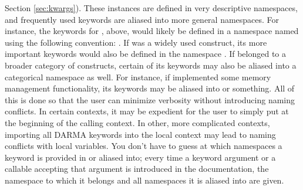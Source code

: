 Section \ref{sec:kwargs}).  These instances are defined in very descriptive namespaces,
and frequently used keywords are aliased into more general namespaces. 
For instance, the keywords for , above, would likely be 
defined in a namespace named using the following convention:
.
If  was a 
widely used construct, its more important keywords would also be defined 
in the namespace . 
If  belonged to a broader category of 
constructs, certain of its keywords may also be aliased into a 
categorical namespace as well.  For instance, if  
implemented some memory management functionality,
its keywords may be aliased into  or 
something.  All of this is done so that the user can minimize verbosity without introducing
naming conflicts.  In certain contexts, it may be expedient for the user to simply
put  at the beginning of the calling context. 
In other, more complicated contexts, importing all DARMA keywords into the 
local context may lead to naming conflicts with local variables. 
You don't have to guess at which namespaces
a keyword is provided in or aliased into; every time a keyword argument or a callable
accepting that argument is introduced in the documentation, the namespace to which 
it belongs and all namespaces it is aliased into are given.


